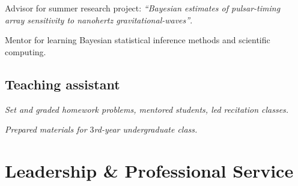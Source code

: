 \documentclass[11pt,letterpaper,sans]{moderncv}
\begin{document}
\vspace{-0.1cm}
\hspace{0.71cm} Advisor for summer research project: \textit{``Bayesian estimates of pulsar-timing \\ \vspace{-0.1cm}
\hspace{0.6cm} array sensitivity to nanohertz gravitational-waves''}. \vspace{0.1cm}

 \vspace{-0.1cm}
\hspace{0.71cm} Mentor for learning Bayesian statistical inference methods and scientific computing.

\subsection{Teaching assistant}

\vspace{-0.1cm}
\hspace{0.71cm} \textit{Set and graded homework problems, mentored students, led recitation classes.}

\vspace{-0.1cm}
\hspace{0.71cm} \textit{Prepared materials for $3$rd-year undergraduate class.} \vspace{-0.1cm}

\section{Leadership \& Professional Service}
\end{document}
